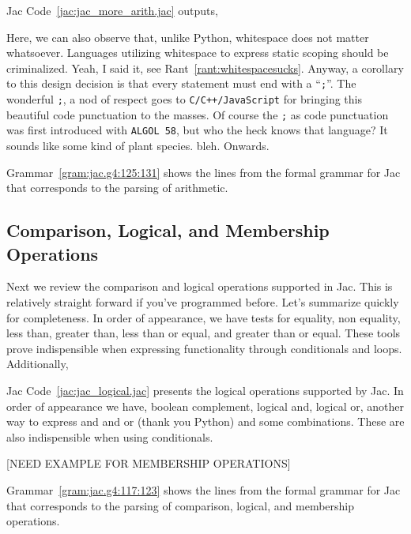 
Jac Code~\ref{jac:jac_more_arith.jac} outputs,


Here, we can also observe that, unlike Python, whitespace does not matter whatsoever. Languages utilizing whitespace to express static scoping should be criminalized. Yeah, I said it, see Rant~\ref{rant:whitespacesucks}. Anyway, a corollary to this design decision is that every statement must end with a ``\texttt{;}''. The wonderful \texttt{;}, a nod of respect goes to \texttt{C/C++/JavaScript} for bringing this beautiful code punctuation to the masses. Of course the \texttt{;} as code punctuation was first introduced with \texttt{ALGOL 58}, but who the heck knows that language? It sounds like some kind of plant species. \Gls{bleh}. Onwards.

\begin{nerd}
    Grammar~\ref{gram:jac.g4:125:131} shows  the lines from the formal grammar for Jac that corresponds to the parsing of arithmetic.
\end{nerd}

\subsection{Comparison, Logical, and Membership Operations}
Next we review the comparison and logical operations supported in Jac. This is relatively straight forward if you've programmed before. Let's summarize quickly for completeness.
In order of appearance, we have tests for equality, non equality, less than, greater than, less than or equal, and greater than or equal. These tools prove indispensible when expressing functionality through conditionals and loops. Additionally,

Jac Code~\ref{jac:jac_logical.jac} presents the logical operations supported by Jac. In order of appearance we have, boolean complement, logical and, logical or, another way to express and and or (thank you Python) and some combinations. These are also indispensible when using conditionals.

[NEED EXAMPLE FOR MEMBERSHIP OPERATIONS]

\begin{nerd}
    Grammar~\ref{gram:jac.g4:117:123} shows the lines from the formal grammar for Jac that corresponds to the parsing of comparison, logical, and membership operations.
\end{nerd}


